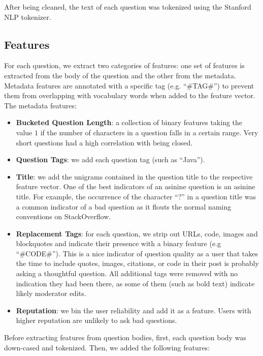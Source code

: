\documentclass[11pt]{article}
\begin{document}
After being cleaned, the text of each question was tokenized using the Stanford NLP tokenizer.

\subsection{Features}

For each question, we extract two categories of features: one set of
features is extracted from the body of the question and the other from
the metadata. Metadata features are annotated with a specific tag
(e.g. ``\#TAG\#'') to prevent them from overlapping with vocabulary
words when added to the feature vector. The metadata features:

\begin{itemize}
  \item \textbf{Bucketed Question Length}: a collection of binary
    features taking the value $1$ if the number of characters in a
    question falls in a certain range. Very short questions had a high correlation with being closed.
  \item \textbf{Question Tags}: we add each question tag (such as
    ``Java'').
  \item \textbf{Title}: we add the unigrams contained in the question
    title to the respective feature vector. One of the best indicators of an asinine question is an asinine title. For example, the occurrence of the character ``?'' in a question title was a common indicator of a bad question as it flouts the normal naming conventions on StackOverflow.
  \item \textbf{Replacement Tags}: for each question, we strip out
    URLs, code, images and blockquotes and indicate their presence
    with a binary feature (e.g ``\#CODE\#''). This is a nice indicator of question quality as a user that takes the time to include quotes, images, citations, or code in their post is probably asking a thoughtful question. All additional tags were removed with no indication they had been there, as some of them (such as bold text) indicate likely moderator edits.
  \item \textbf{Reputation}: we bin the user reliability and add it as
    a feature. Users with higher reputation are unlikely to ask bad questions.
\end{itemize}

Before extracting features from question bodies, first, each question
body was down-cased and tokenized. Then, we added the following
features:
\end{document}
